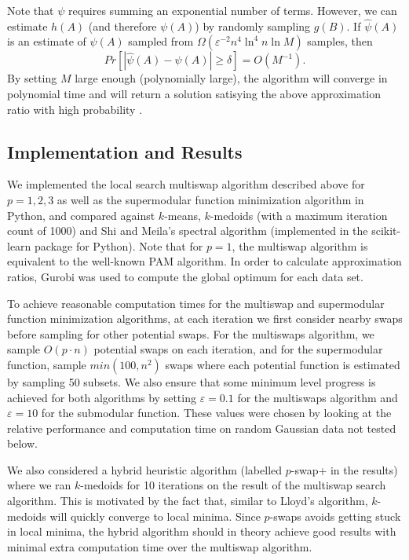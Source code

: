 \documentclass{article}
\begin{document}
Note that $\psi$ requires summing an exponential number of terms. However, we can estimate $h(A)$ (and therefore $\psi(A)$) by randomly sampling $g(B)$. If $\hat{\psi}(A)$ is an estimate of $\psi(A)$ sampled from $\Omega (\varepsilon^{-2} n^4 \ln^4 n \ln M)$ samples, then 
\[ Pr[ | \hat{\psi}(A) - \psi(A) | \geq \delta ] = O(M^{-1}). \]
By setting $M$ large enough (polynomially large), the algorithm will converge in polynomial time and will return a solution satisying the above approximation ratio with high probability \cite{Sviridenko}. 
 
\subsection{Implementation and Results}

We implemented the local search multiswap algorithm described above for $p=1, 2, 3$ as well as the supermodular function minimization algorithm in Python, and compared against $k$-means, $k$-medoids (with a maximum iteration count of 1000) and Shi and Meila's spectral algorithm (implemented in the scikit-learn package for Python). Note that for $p=1$, the multiswap algorithm is equivalent to the well-known PAM algorithm.  In order to calculate approximation ratios, Gurobi was used to compute the global optimum for each data set.

To achieve reasonable computation times for the multiswap and supermodular function minimization algorithms, at each iteration we first consider nearby swaps before sampling for other potential swaps. For the multiswaps algorithm, we sample $O(p\cdot n)$ potential swaps on each iteration, and for the supermodular function, sample $min(100,n^2)$ swaps where each potential function is estimated by sampling 50 subsets. We also ensure that some minimum level progress is achieved for both algorithms by setting $\varepsilon = 0.1$ for the multiswaps algorithm and $\varepsilon = 10$ for the submodular function. These values were chosen by looking at the relative performance and computation time on random Gaussian data not tested below.

We also considered a hybrid heuristic algorithm (labelled $p$-swap+ in the results) where we ran $k$-medoids for 10 iterations on the result of the multiswap search algorithm.  This is motivated by the fact that, similar to Lloyd's algorithm, $k$-medoids will quickly converge to local minima.  Since $p$-swaps avoids getting stuck in local minima, the hybrid algorithm should in theory achieve good results with minimal extra computation time over the multiswap algorithm.
\end{document}
